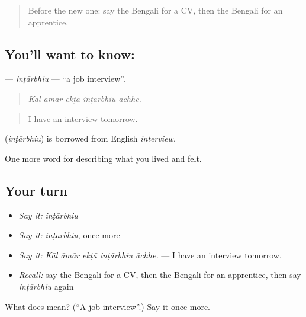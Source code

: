 \label{lesson:BN-C494-intarbhiu}



\begin{quote}
Before the new one: say the Bengali for a CV, then the Bengali for an apprentice.
\end{quote}

\subsection*{You'll want to know: }
\textbf{} — \emph{inṭārbhiu} — \textquotedblleft{}a job interview\textquotedblright{}.

\begin{quote}
    
\end{quote}

\begin{quote}
\emph{Kāl āmār ekṭā inṭārbhiu āchhe.}
\end{quote}

\begin{quote}
I have an interview tomorrow.
\end{quote}

\begin{cousinweb}
\textbf{} (\emph{inṭārbhiu}) is borrowed from English \emph{interview}.
\end{cousinweb}

\begin{grammarlens}[title={What you've built}]
One more word for describing what you lived and felt.
\end{grammarlens}

\subsection*{Your turn}
\begin{itemize}
\raggedright
  \item \emph{Say it:} \emph{inṭārbhiu}
  \item \emph{Say it:} \emph{inṭārbhiu}, once more
  \item \emph{Say it:} \emph{Kāl āmār ekṭā inṭārbhiu āchhe.} — I have an interview tomorrow.
  \item \emph{Recall:} say the Bengali for a CV, then the Bengali for an apprentice, then say \emph{inṭārbhiu} again
\end{itemize}

\begin{tcolorbox}[breakable,colback=teal!4,colframe=teal!35!black,title={Before you move on}]
What does  mean? (\textquotedblleft{}A job interview\textquotedblright{}.) Say it once more.
\end{tcolorbox}
